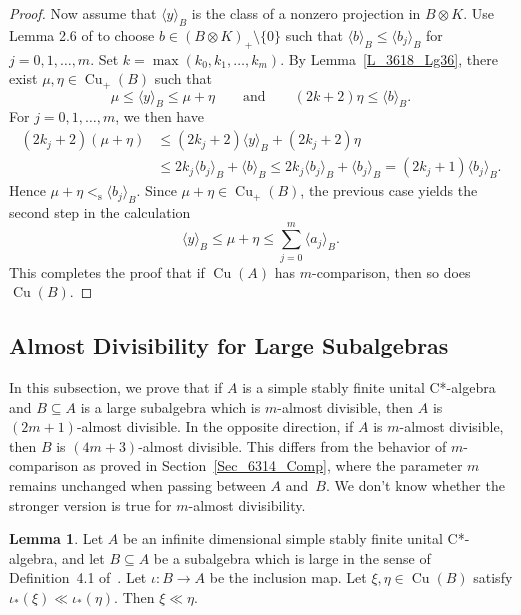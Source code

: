 \documentclass[10pt]{amsart}
\numberwithin{equation}{section}
\theoremstyle{definition}
\newtheorem{lem}[thm]{Lemma}
\newcommand{\et}{\eta}
\newcommand{\io}{\iota}
\newcommand{\Cu}{{\operatorname{Cu}}}
\newcommand{\andeqn}{\qquad {\mbox{and}} \qquad}
\newcommand{\uca}{unital C*-algebra}
\renewcommand{\S}{\subseteq}
\newcommand{\cc}[1]{\langle #1 \rangle}
\newcommand{\les}{<_{\operatorname{s}}}
\begin{document}
\begin{proof}
Now assume that $\cc{y}_B$ is the class of a nonzero
projection in $B \otimes K$.
Use Lemma 2.6 of \cite{Phl40} to choose
$b \in (B \otimes K)_{+} \setminus \{0\}$ such that
$\cc{b}_B \leq \cc{b_j}_B$ for $j = 0, 1, \hdots, m$.
Set $k = \max ( k_0, k_1, \ldots, k_m )$.
By Lemma~\ref{L_3618_Lg36}, there exist $\mu, \eta \in \Cu_{+} (B)$
such that
\[
\mu \leq \cc{y}_B \leq \mu + \eta
\andeqn
(2 k + 2) \eta \leq \cc{b}_B.
\]
For $j = 0, 1, \hdots, m$, we then have
\[
\begin{split}
(2 k_j + 2) (\mu + \eta)
& \leq (2 k_j + 2) \cc{y}_B + (2 k_j + 2) \eta
\\
& \leq 2 k_j \cc{b_j}_B + \cc{b}_B
  \leq 2 k_j \cc{b_j}_B + \cc{b_j}_B
  = (2 k_j + 1) \cc{b_j}_B.
\end{split}
\]
Hence $\mu + \eta \les \cc{b_j}_B$.
Since $\mu + \eta \in \Cu_{+} (B)$, the previous case yields
the second step in the calculation
\[
\cc{y}_B \leq \mu + \eta \leq \sum_{j = 0}^m \cc{a_j}_B.
\]
This completes the proof that if $\Cu (A)$ has
$m$-comparison, then so does $\Cu (B)$.
\end{proof}

\subsection{Almost Divisibility for Large Subalgebras}\label{Sec_6314_AD}
%
In this subsection, we prove that
if $A$ is a simple stably finite \uca{} and $B \S A$ is a
large subalgebra which is $m$-almost divisible, then $A$ is
$(2 m + 1)$-almost divisible.
In the opposite direction, if $A$ is
$m$-almost divisible, then $B$ is $(4m + 3)$-almost divisible.
This differs from the behavior of $m$-comparison
as proved in Section~\ref{Sec_6314_Comp},
where the parameter $m$ remains unchanged when
passing between $A$ and~$B$.
We don't know whether the stronger version is true for
$m$-almost divisibility.

\begin{lem}\label{L_5Z29_CC_down}
Let $A$ be an infinite dimensional simple stably finite \uca,
and let $B \S A$ be a subalgebra
which is large in the sense of Definition~4.1 of~\cite{Phl40}.
Let $\io \colon B \to A$ be the inclusion map.
Let $\xi, \et \in \Cu (B)$ satisfy $\io_* (\xi) \ll \io_* (\et)$.
Then $\xi \ll \et$.
\end{lem}
\end{document}
